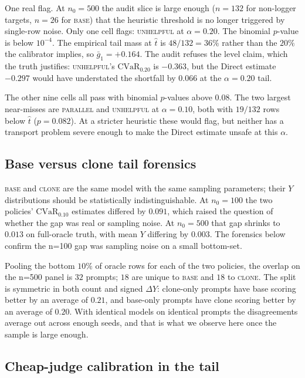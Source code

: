 \documentclass[11pt]{article}
\newcommand{\that}{\widehat{t}}
\newcommand{\CVaR}{\mathrm{CVaR}}
\begin{document}
One real flag. At $n_0 = 500$ the audit slice is large enough
($n = 132$ for non-logger targets, $n = 26$ for \textsc{base}) that
the heuristic threshold is no longer triggered by single-row noise.
Only one cell flags: \textsc{unhelpful} at $\alpha = 0.20$. The
binomial $p$-value is below $10^{-4}$. The empirical tail mass at
$\that$ is $48 / 132 = 36\%$ rather than the $20\%$ the calibrator
implies, so $\bar g_1 = +0.164$. The audit refuses the level claim,
which the truth justifies: \textsc{unhelpful}'s $\CVaR_{0.20}$ is
$-0.363$, but the Direct estimate $-0.297$ would have understated the
shortfall by $0.066$ at the $\alpha = 0.20$ tail.

The other nine cells all pass with binomial $p$-values above $0.08$.
The two largest near-misses are \textsc{parallel} and \textsc{unhelpful}
at $\alpha = 0.10$, both with $19/132$ rows below $\that$ ($p = 0.082$).
At a stricter heuristic these would flag, but neither has a transport
problem severe enough to make the Direct estimate unsafe at this
$\alpha$.

\subsection{Base versus clone tail forensics}
\label{app:bcforensics}

\textsc{base} and \textsc{clone} are the same model with the same
sampling parameters; their $Y$ distributions should be statistically
indistinguishable. At $n_0 = 100$ the two policies' $\CVaR_{0.10}$
estimates differed by $0.091$, which raised the question of whether
the gap was real or sampling noise. At $n_0 = 500$ that gap shrinks
to $0.013$ on full-oracle truth, with mean $Y$ differing by $0.003$.
The forensics below confirm the n=100 gap was sampling noise on a
small bottom-set.

Pooling the bottom $10\%$ of oracle rows for each of the two policies,
the overlap on the n=500 panel is $32$ prompts; $18$ are unique to
\textsc{base} and $18$ to \textsc{clone}. The split is symmetric in
both count and signed $\Delta Y$: clone-only prompts have base scoring
better by an average of $0.21$, and base-only prompts have clone
scoring better by an average of $0.20$. With identical models on
identical prompts the disagreements average out across enough seeds,
and that is what we observe here once the sample is large enough.

\subsection{Cheap-judge calibration in the tail}
\label{app:reliability}
\end{document}
